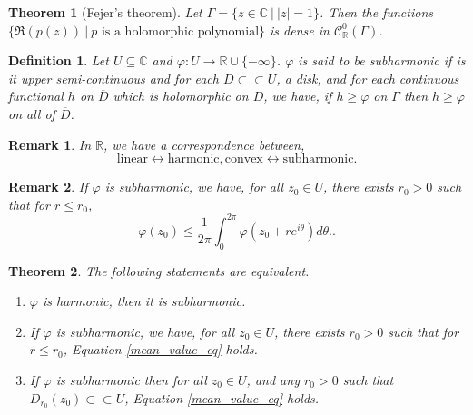\documentclass{article}
\newtheorem{theorem}{Theorem} [section]
\newtheorem{definition}{Definition}[section]
\newtheorem{remark}{Remark}[section]
\newcommand{\R}[0]{\mathbb{R}}
\newcommand{\C}[0]{\mathbb{C}}
\newcommand{\sep}[0]{\:|\:}
\begin{document}
\begin{theorem}[Fejer's theorem]
  Let $\Gamma = \{z\in\C\sep \vert z\vert=1\}$.
  Then the functions $\{\Re (p(z))\sep p\text{ is a holomorphic polynomial}\}$ is dense in $\mathcal{C}_\R^0(\Gamma)$.
\end{theorem}

\begin{definition}
  Let $U\subseteq \C$ and $\varphi:U\to\R\cup\{-\infty\}$. $\varphi$ is said to be subharmonic if is it upper semi-continuous and for each $D\subset\subset U$, a disk, and for each continuous functional $h$ on $\overline{D}$ which is holomorphic on $D$, we have, if $h\geq \varphi$ on $\Gamma$ then $h\geq\varphi$ on all of $\overline{D}$.
\end{definition}

\begin{remark}
  In $\R$, we have a correspondence between,
  \begin{equation*}
    \text{linear}\leftrightarrow\text{harmonic},\text{convex}\leftrightarrow\text{subharmonic}.
  \end{equation*}
\end{remark}

\begin{remark}
  If $\varphi$ is subharmonic, we have, for all $z_0\in U$, there exists $r_0>0$ such that for $r\leq r_0$,
  \begin{equation*}
    \varphi(z_0)\leq {\frac 1 {2\pi}}\int_0^{2\pi}\varphi(z_0+re^{i\theta})d\theta.\label{mean_value_eq}\tag{M}.
  \end{equation*}
\end{remark}

\begin{theorem}
  The following statements are equivalent.
  \begin{enumerate}[1).]
    \item $\varphi$ is harmonic, then it is subharmonic.
    \item If $\varphi$ is subharmonic, we have, for all $z_0\in U$, there exists $r_0>0$ such that for $r\leq r_0$, Equation \eqref{mean_value_eq} holds.
    \item If $\varphi$ is subharmonic then for all $z_0\in U$, and any $r_0>0$ such that $D_{r_0}(z_0)\subset\subset U$, Equation \eqref{mean_value_eq} holds.
  \end{enumerate}
\end{theorem}
\end{document}
